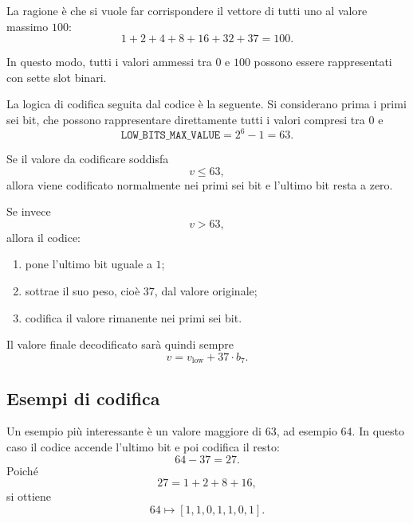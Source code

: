 La ragione \`e che si vuole far corrispondere il vettore di tutti uno al valore massimo $100$:
\begin{equation}
1 + 2 + 4 + 8 + 16 + 32 + 37 = 100.
\end{equation}

In questo modo, tutti i valori ammessi tra $0$ e $100$ possono essere rappresentati con sette slot binari.

La logica di codifica seguita dal codice \`e la seguente. Si considerano prima i primi sei bit, che possono rappresentare direttamente tutti i valori compresi tra $0$ e
\begin{equation}
\texttt{LOW\_BITS\_MAX\_VALUE} = 2^{6}-1 = 63.
\end{equation}

Se il valore da codificare soddisfa
\begin{equation}
v \leq 63,
\end{equation}
allora viene codificato normalmente nei primi sei bit e l'ultimo bit resta a zero.

Se invece
\begin{equation}
v > 63,
\end{equation}
allora il codice:
\begin{enumerate}
  \item pone l'ultimo bit uguale a $1$;
  \item sottrae il suo peso, cio\`e $37$, dal valore originale;
  \item codifica il valore rimanente nei primi sei bit.
\end{enumerate}

Il valore finale decodificato sar\`a quindi sempre
\begin{equation}
v = v_{\text{low}} + 37 \cdot b_7.
\end{equation}

\subsection{Esempi di codifica}
Un esempio pi\`u interessante \`e un valore maggiore di $63$, ad esempio $64$. In questo caso il codice accende l'ultimo bit e poi codifica il resto:
\begin{equation}
64 - 37 = 27.
\end{equation}
Poich\'e
\begin{equation}
27 = 1 + 2 + 8 + 16,
\end{equation}
si ottiene
\begin{equation}
64 \longmapsto [1,1,0,1,1,0,1].
\end{equation}

